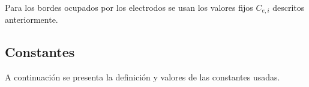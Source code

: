 Para los bordes ocupados por los electrodos se usan los valores fijos $C_{e,i}$ descritos anteriormente.


\subsection*{Constantes}
A continuación se presenta la definición y valores de las constantes usadas.


\newcommand{\lineaTabla}[3]{ ${#1}$ & {#3} & {#2} \\ }

\newcommand{\anodo}[3] {
	\lineaTabla{C_{a,{#1}}}{\num{#2} \si{#3}}{Concentración de #1 en el ánodo}
}

\newcommand{\catodo}[3] {
	\lineaTabla{C_{c,{#1}}}{\num{#2} \si{#3}}{Concentración de #1 en el cátodo}
}

